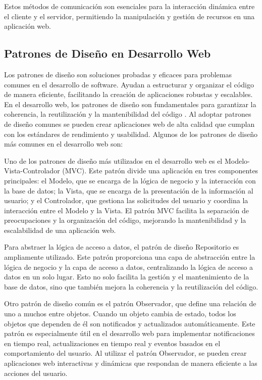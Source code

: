 Estos métodos de comunicación son esenciales para la interacción dinámica entre el cliente y el servidor, permitiendo la manipulación y gestión de recursos en una aplicación web.


\subsection{Patrones de Diseño en Desarrollo Web}
Los patrones de diseño son soluciones probadas y eficaces para problemas comunes en el desarrollo de software. Ayudan a estructurar y organizar el código de manera eficiente, facilitando la creación de aplicaciones robustas y escalables. En el desarrollo web, los patrones de diseño son fundamentales para garantizar la coherencia, la reutilización y la mantenibilidad del código \cite{patrones}. Al adoptar patrones de diseño comunes se pueden crear aplicaciones web de alta calidad que cumplan con los estándares de rendimiento y usabilidad. Algunos de los patrones de diseño más comunes en el desarrollo web son:

Uno de los patrones de diseño más utilizados en el desarrollo web es el Modelo-Vista-Controlador (MVC). Este patrón divide una aplicación en tres componentes principales: el Modelo, que se encarga de la lógica de negocio y la interacción con la base de datos; la Vista, que se encarga de la presentación de la información al usuario; y el Controlador, que gestiona las solicitudes del usuario y coordina la interacción entre el Modelo y la Vista. El patrón MVC facilita la separación de preocupaciones y la organización del código, mejorando la mantenibilidad y la escalabilidad de una aplicación web.

Para abstraer la lógica de acceso a datos, el patrón de diseño Repositorio es ampliamente utilizado. Este patrón proporciona una capa de abstracción entre la lógica de negocio y la capa de acceso a datos, centralizando la lógica de acceso a datos en un solo lugar. Esto no solo facilita la gestión y el mantenimiento de la base de datos, sino que también mejora la coherencia y la reutilización del código.

Otro patrón de diseño común es el patrón Observador, que define una relación de uno a muchos entre objetos. Cuando un objeto cambia de estado, todos los objetos que dependen de él son notificados y actualizados automáticamente. Este patrón es especialmente útil en el desarrollo web para implementar notificaciones en tiempo real, actualizaciones en tiempo real y eventos basados en el comportamiento del usuario. Al utilizar el patrón Observador, se pueden crear aplicaciones web interactivas y dinámicas que respondan de manera eficiente a las acciones del usuario.


